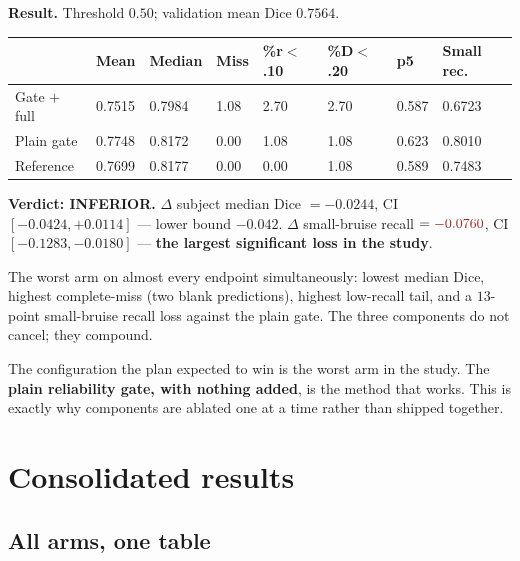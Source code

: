 \documentclass[11pt]{article}
\newcommand{\lose}[1]{\textcolor{losered}{#1}}
\begin{document}
\vspace{6pt}
\textbf{Result.} Threshold $0.50$; validation mean Dice $0.7564$.

\begin{center}\small
\begin{tabular}{K q q q q q q M}
\toprule
& \textbf{Mean} & \textbf{Median} & \textbf{Miss} & \textbf{\%r$<$.10} & \textbf{\%D$<$.20} &
\textbf{p5} & \textbf{Small rec.} \\
\midrule
Gate $+$ full & 0.7515 & \lose{0.7984} & \lose{1.08} & \lose{2.70} & 2.70 & 0.587 &
  \lose{0.6723} \\
Plain gate    & 0.7748 & 0.8172 & 0.00 & 1.08 & 1.08 & 0.623 & 0.8010 \\
Reference     & 0.7699 & 0.8177 & 0.00 & 0.00 & 1.08 & 0.589 & 0.7483 \\
\bottomrule
\end{tabular}
\end{center}

\textbf{Verdict: \lose{INFERIOR}.}
$\Delta$ subject median Dice $=-0.0244$, CI $[-0.0424,+0.0114]$ --- lower bound $-0.042$.
$\Delta$ small-bruise recall $=\lose{-0.0760}$, CI $[-0.1283,-0.0180]$ --- \textbf{the largest
significant loss in the study}.

The worst arm on almost every endpoint simultaneously: lowest median Dice, highest complete-miss
(two blank predictions), highest low-recall tail, and a $13$-point small-bruise recall loss against
the plain gate. The three components do not cancel; they compound.

\begin{keybox}
The configuration the plan expected to win is the worst arm in the study. The \textbf{plain
reliability gate, with nothing added}, is the method that works. This is exactly why components are
ablated one at a time rather than shipped together.
\end{keybox}

\section{Consolidated results}

\subsection{All arms, one table}
\end{document}
